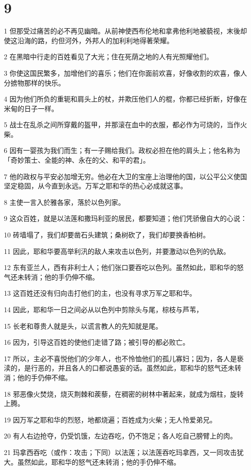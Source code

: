 \chapter{9}

\par 1 但那受过痛苦的必不再见幽暗。从前神使西布伦地和拿弗他利地被藐视，末後却使这沿海的路，约但河外，外邦人的加利利地得著荣耀。
\par 2 在黑暗中行走的百姓看见了大光；住在死荫之地的人有光照耀他们。
\par 3 你使这国民繁多，加增他们的喜乐；他们在你面前欢喜，好像收割的欢喜，像人分掳物那样的快乐。
\par 4 因为他们所负的重轭和肩头上的杖，并欺压他们人的棍，你都已经折断，好像在米甸的日子一样。
\par 5 战士在乱杀之间所穿戴的盔甲，并那滚在血中的衣服，都必作为可烧的，当作火柴。
\par 6 因有一婴孩为我们而生；有一子赐给我们。政权必担在他的肩头上；他名称为「奇妙策士、全能的神、永在的父、和平的君」。
\par 7 他的政权与平安必加增无穷。他必在大卫的宝座上治理他的国，以公平公义使国坚定稳固，从今直到永远。万军之耶和华的热心必成就这事。
\par 8 主使一言入於雅各家，落於以色列家。
\par 9 这众百姓，就是以法莲和撒玛利亚的居民，都要知道；他们凭骄傲自大的心说：
\par 10 砖墙塌了，我们却要凿石头建筑；桑树砍了，我们却要换香柏树。
\par 11 因此，耶和华要高举利汛的敌人来攻击以色列，并要激动以色列的仇敌。
\par 12 东有亚兰人，西有非利士人；他们张口要吞吃以色列。虽然如此，耶和华的怒气还未转消；他的手仍伸不缩。
\par 13 这百姓还没有归向击打他们的主，也没有寻求万军之耶和华。
\par 14 因此，耶和华一日之间必从以色列中剪除头与尾，棕枝与芦苇，
\par 15 长老和尊贵人就是头，以谎言教人的先知就是尾。
\par 16 因为，引导这百姓的使他们走错了路；被引导的都必败亡。
\par 17 所以，主必不喜悦他们的少年人，也不怜恤他们的孤儿寡妇；因为，各人是亵渎的，是行恶的，并且各人的口都说愚妄的话。虽然如此，耶和华的怒气还未转消；他的手仍伸不缩。
\par 18 邪恶像火焚烧，烧灭荆棘和蒺藜，在稠密的树林中著起来，就成为烟柱，旋转上腾。
\par 19 因万军之耶和华的烈怒，地都烧遍；百姓成为火柴；无人怜爱弟兄。
\par 20 有人右边抢夺，仍受饥饿，左边吞吃，仍不饱足；各人吃自己膀臂上的肉。
\par 21 玛拿西吞吃（或作：攻击；下同）以法莲；以法莲吞吃玛拿西，又一同攻击犹大。虽然如此，耶和华的怒气还未转消；他的手仍伸不缩。

